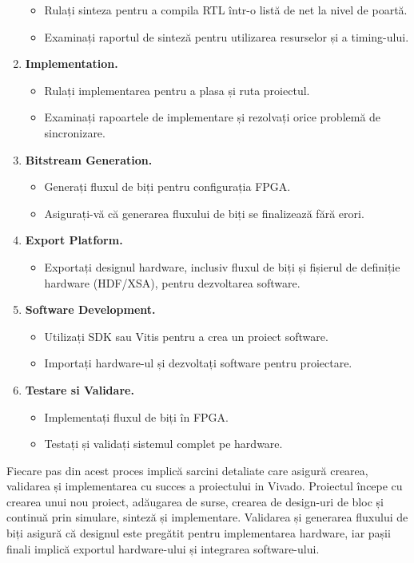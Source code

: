 \documentclass[12pt]{article}
\begin{document}
\begin{enumerate}
\begin{itemize}
            \item Rulați sinteza pentru a compila RTL într-o listă de net la nivel de poartă.
            \item Examinați raportul de sinteză pentru utilizarea resurselor și a timing-ului.
        \end{itemize}
    \item \textbf{Implementation.} 
        \begin{itemize}
            \item Rulați implementarea pentru a plasa și ruta proiectul.
            \item Examinați rapoartele de implementare și rezolvați orice problemă de sincronizare.
        \end{itemize}
    \item \textbf{Bitstream Generation.} 
        \begin{itemize}
            \item Generați fluxul de biți pentru configurația FPGA.
            \item Asigurați-vă că generarea fluxului de biți se finalizează fără erori.
        \end{itemize}
    \item \textbf{Export Platform.} 
        \begin{itemize}
            \item Exportați designul hardware, inclusiv fluxul de biți și fișierul de definiție hardware (HDF/XSA), pentru dezvoltarea software.
        \end{itemize}
    \item \textbf{Software Development.} 
        \begin{itemize}
            \item Utilizați SDK sau Vitis pentru a crea un proiect software.
            \item Importați hardware-ul și dezvoltați software pentru proiectare.
        \end{itemize}
    \item \textbf{Testare si Validare.} 
        \begin{itemize}
            \item Implementați fluxul de biți în FPGA.
            \item Testați și validați sistemul complet pe hardware.
        \end{itemize}
\end{enumerate}
\hspace*{1cm}Fiecare pas din acest proces implică sarcini detaliate care asigură crearea, validarea și implementarea cu succes a proiectului in Vivado. Proiectul începe cu crearea unui nou proiect, adăugarea de surse, crearea de design-uri de bloc și continuă prin simulare, sinteză și implementare. Validarea și generarea fluxului de biți asigură că designul este pregătit pentru implementarea hardware, iar pașii finali implică exportul hardware-ului și integrarea software-ului.
\end{document}
